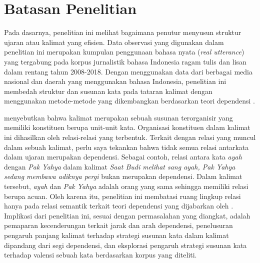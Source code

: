 \section{Batasan Penelitian}
Pada dasarnya, penelitian ini melihat bagaimana penutur menyusun struktur ujaran atau kalimat yang efisien. Data observasi yang digunakan dalam penelitian ini merupakan kumpulan penggunaan bahasa nyata (\textit{real utterance}) yang tergabung pada korpus jurnalistik bahasa Indonesia ragam tulis dan lisan dalam rentang tahun 2008-2018. Dengan menggunakan data dari berbagai media nasional dan daerah yang menggunakan bahasa Indonesia, penelitian ini membedah struktur dan susunan kata pada tataran kalimat dengan menggunakan metode-metode yang dikembangkan berdasarkan teori dependensi \citep{tesniere1959elements}. 

\cite{tesniere1959elements} menyebutkan bahwa kalimat merupakan sebuah susunan terorganisir yang memiliki konstituen berupa unit-unit kata. Organisasi konstituen dalam kalimat ini dihasilkan oleh relasi-relasi yang terbentuk. Terkait dengan relasi yang muncul dalam sebuah kalimat, perlu saya tekankan bahwa tidak semua relasi antarkata dalam ujaran merupakan dependensi. Sebagai contoh, relasi antara kata \textit{ayah} dengan \textit{Pak Yahya} dalam kalimat \textit{Saat Budi melihat sang ayah, Pak Yahya sedang membawa adiknya pergi} bukan merupakan dependensi. Dalam kalimat tersebut, \textit{ayah} dan \textit{Pak Yahya} adalah orang yang sama sehingga memiliki relasi berupa acuan. Oleh karena itu, penelitian ini membatasi ruang lingkup relasi hanya pada relasi semantik terkait teori dependensi yang dijabarkan oleh \cite{tesniere1959elements}. Implikasi dari penelitian ini, sesuai dengan permasalahan yang diangkat, adalah pemaparan kecenderungan terkait jarak dan arah dependensi, penelusuran pengaruh panjang kalimat terhadap strategi susunan kata dalam kalimat dipandang dari segi dependensi, dan eksplorasi pengaruh strategi susunan kata terhadap valensi sebuah kata berdasarkan korpus yang diteliti. 

